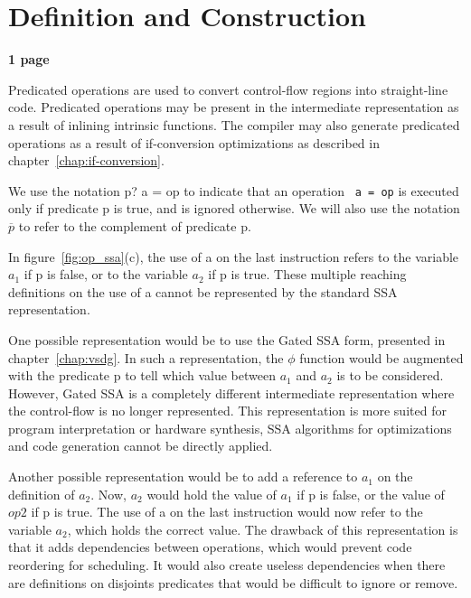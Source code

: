 \section{Definition and Construction}

\textbf{1 page}


Predicated operations are used to convert control-flow regions into
straight-line code. Predicated operations may be present in the intermediate
representation as a result of inlining intrinsic functions. The compiler may
also generate predicated operations as a result of if-conversion optimizations
as described in chapter~\ref{chap:if-conversion}.

We use the notation {p? a = op} to indicate that an operation \texttt{
  a = op} is executed only if predicate {p} is true, and is
ignored otherwise. We will also use the notation $\overline{{p}}$
to refer to the complement of predicate {p}.

In figure~\ref{fig:op_ssa}(c), the use of {a} on the last
instruction refers to the variable ${a}_1$ if {p} is false, or
to the variable ${a}_2$ if {p} is true. These multiple
reaching definitions on the use of {a} cannot be represented by
the standard SSA representation.

One possible representation would be to use the Gated SSA form,
presented in chapter~\ref{chap:vsdg}. In such a representation, the
$\phi$ function would be augmented with the predicate {p} to tell
which value between ${a}_1$ and ${a}_2$ is to be
considered. However, Gated SSA is a completely different intermediate
representation where the control-flow is no longer represented. This
representation is more suited for program interpretation or hardware
synthesis, SSA algorithms for optimizations and code generation cannot
be directly applied.

Another possible representation would be to add a reference to ${
  a_1}$ on the definition of ${a}_2$. Now, ${a}_2$ would hold
the value of ${a}_1$ if {p} is false, or the value of ${
  op2}$ if {p} is true. The use of {a} on the last instruction
would now refer to the variable ${a}_2$, which holds the correct
value. The drawback of this representation is that it adds
dependencies between operations, which would prevent code reordering
for scheduling. It would also create useless dependencies when there
are definitions on disjoints predicates that would be difficult to
ignore or remove.

